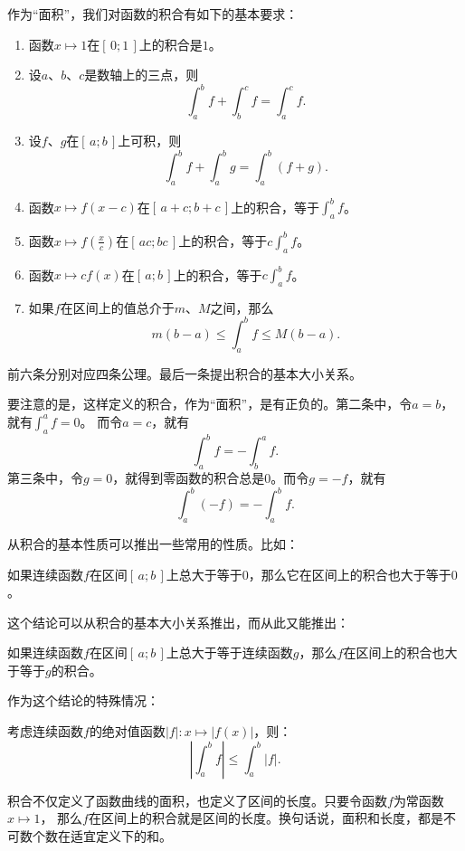 \documentclass[12pt,UTF8,fontset=none]{ctexbook}
\begin{document}
作为“面积”，我们对函数的积合有如下的基本要求：

\begin{enumerate}
    \item 函数$x\mapsto 1$在$[\,0;1\,]$上的积合是$1$。
    \item 设$a$、$b$、$c$是数轴上的三点，则
        $$\int_a^b f + \int_b^c f = \int_a^c f.$$
    \item 设$f$、$g$在$[\,a; b\,]$上可积，则
        $$ \int_a^b f + \int_a^b g = \int_a^b (f + g). $$
    \item 函数$x\mapsto f(x-c)$在$[\,a+c;b+c\,]$上的积合，等于$\int_a^b f$。
    \item 函数$x\mapsto f\left(\frac{x}{c}\right)$在$[\,ac; bc\,]$上的积合，等于$c\int_a^b f$。
    \item 函数$x\mapsto cf(x)$在$[\,a; b\,]$上的积合，等于$c\int_a^b f$。
    \item 如果$f$在区间上的值总介于$m$、$M$之间，那么
        $$m(b - a) \leqslant \int_a^b f \leqslant M(b - a).$$
\end{enumerate}
前六条分别对应四条公理。最后一条提出积合的基本大小关系。

要注意的是，这样定义的积合，作为“面积”，是有正负的。第二条中，令$a=b$，就有$\int_a^a f = 0$。
而令$a = c$，就有
$$\int_a^b f = - \int_b^a f.$$
第三条中，令$g=0$，就得到零函数的积合总是$0$。而令$g = -f$，就有
$$\int_a^b (-f) = -\int_a^b f. $$

从积合的基本性质可以推出一些常用的性质。比如：

\begin{tm}
    如果连续函数$f$在区间$[\,a; b\,]$上总大于等于$0$，那么它在区间上的积合也大于等于$0$。
\end{tm}

这个结论可以从积合的基本大小关系推出，而从此又能推出：

\begin{tm}
    如果连续函数$f$在区间$[\,a; b\,]$上总大于等于连续函数$g$，那么$f$在区间上的积合也大于等于$g$的积合。
\end{tm}

作为这个结论的特殊情况：

\begin{tm}
    考虑连续函数$f$的绝对值函数$|f|: x\mapsto |f(x)|$，则：
    $$ \left| \int_a^b f \right| \leqslant \int_a^b |f|. $$

\end{tm}

积合不仅定义了函数曲线的面积，也定义了区间的长度。只要令函数$f$为常函数$x\mapsto 1$，
那么$f$在区间上的积合就是区间的长度。换句话说，面积和长度，都是不可数个数在适宜定义下的和。
\end{document}
